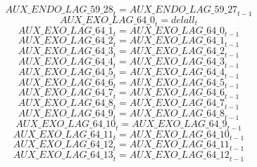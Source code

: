\begin{dmath}
{AUX\_ENDO\_LAG\_59\_28}_{t}={AUX\_ENDO\_LAG\_59\_27}_{t-1}
\end{dmath}
\begin{dmath}
{AUX\_EXO\_LAG\_64\_0}_{t}={delall}_{t}
\end{dmath}
\begin{dmath}
{AUX\_EXO\_LAG\_64\_1}_{t}={AUX\_EXO\_LAG\_64\_0}_{t-1}
\end{dmath}
\begin{dmath}
{AUX\_EXO\_LAG\_64\_2}_{t}={AUX\_EXO\_LAG\_64\_1}_{t-1}
\end{dmath}
\begin{dmath}
{AUX\_EXO\_LAG\_64\_3}_{t}={AUX\_EXO\_LAG\_64\_2}_{t-1}
\end{dmath}
\begin{dmath}
{AUX\_EXO\_LAG\_64\_4}_{t}={AUX\_EXO\_LAG\_64\_3}_{t-1}
\end{dmath}
\begin{dmath}
{AUX\_EXO\_LAG\_64\_5}_{t}={AUX\_EXO\_LAG\_64\_4}_{t-1}
\end{dmath}
\begin{dmath}
{AUX\_EXO\_LAG\_64\_6}_{t}={AUX\_EXO\_LAG\_64\_5}_{t-1}
\end{dmath}
\begin{dmath}
{AUX\_EXO\_LAG\_64\_7}_{t}={AUX\_EXO\_LAG\_64\_6}_{t-1}
\end{dmath}
\begin{dmath}
{AUX\_EXO\_LAG\_64\_8}_{t}={AUX\_EXO\_LAG\_64\_7}_{t-1}
\end{dmath}
\begin{dmath}
{AUX\_EXO\_LAG\_64\_9}_{t}={AUX\_EXO\_LAG\_64\_8}_{t-1}
\end{dmath}
\begin{dmath}
{AUX\_EXO\_LAG\_64\_10}_{t}={AUX\_EXO\_LAG\_64\_9}_{t-1}
\end{dmath}
\begin{dmath}
{AUX\_EXO\_LAG\_64\_11}_{t}={AUX\_EXO\_LAG\_64\_10}_{t-1}
\end{dmath}
\begin{dmath}
{AUX\_EXO\_LAG\_64\_12}_{t}={AUX\_EXO\_LAG\_64\_11}_{t-1}
\end{dmath}
\begin{dmath}
{AUX\_EXO\_LAG\_64\_13}_{t}={AUX\_EXO\_LAG\_64\_12}_{t-1}
\end{dmath}
